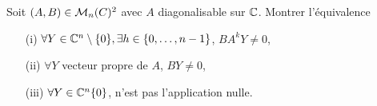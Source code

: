 \begin{exercise}
	Soit $(A,B)\in\mathcal{M}_{n}(C)^{2}$ avec $A$ diagonalisable sur $\mathbb{C}$. Montrer l'équivalence
	\begin{enumerate}
		\item [(i)] $\forall Y\in\mathbb{C}^{n}\setminus\{0\},\exists h\in\{0,\dots,n-1\}$, $BA^{k}Y\neq0$,
		\item [(ii)] $\forall Y$ vecteur propre de $A$, $BY\neq0$,
		\item [(iii)] $\forall Y\in\mathbb{C}^{n}\{0\}$,  n'est pas l'application nulle.
	\end{enumerate}
\end{exercise}